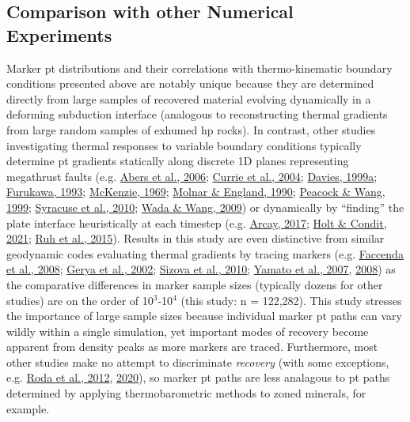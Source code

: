 \hypertarget{comparison-with-other-numerical-experiments}{%
\subsection{Comparison with other Numerical Experiments}\label{comparison-with-other-numerical-experiments}}

Marker \gls{pt} distributions and their correlations with thermo-kinematic boundary conditions presented above are notably unique because they are determined directly from large samples of recovered material evolving dynamically in a deforming subduction interface (analogous to reconstructing thermal gradients from large random samples of exhumed \gls{hp} rocks). In contrast, other studies investigating thermal responses to variable boundary conditions typically determine \gls{pt} gradients statically along discrete 1D planes representing megathrust faults (e.g. \protect\hyperlink{ref-abers2006}{Abers et al., 2006}; \protect\hyperlink{ref-currie2004}{Currie et al., 2004}; \protect\hyperlink{ref-davies1999b}{Davies, 1999a}; \protect\hyperlink{ref-furukawa1993}{Furukawa, 1993}; \protect\hyperlink{ref-mckenzie1969}{McKenzie, 1969}; \protect\hyperlink{ref-molnar1990}{Molnar \& England, 1990}; \protect\hyperlink{ref-peacock1999b}{Peacock \& Wang, 1999}; \protect\hyperlink{ref-syracuse2010}{Syracuse et al., 2010}; \protect\hyperlink{ref-wada2009}{Wada \& Wang, 2009}) or dynamically by ``finding'' the plate interface heuristically at each timestep (e.g. \protect\hyperlink{ref-arcay2017}{Arcay, 2017}; \protect\hyperlink{ref-holt2021}{Holt \& Condit, 2021}; \protect\hyperlink{ref-ruh2015}{Ruh et al., 2015}). Results in this study are even distinctive from similar geodynamic codes evaluating thermal gradients by tracing markers (e.g. \protect\hyperlink{ref-faccenda2008}{Faccenda et al., 2008}; \protect\hyperlink{ref-gerya2002}{Gerya et al., 2002}; \protect\hyperlink{ref-sizova2010}{Sizova et al., 2010}; \protect\hyperlink{ref-yamato2007}{Yamato et al., 2007}, \protect\hyperlink{ref-yamato2008}{2008}) as the comparative differences in marker sample sizes (typically dozens for other studies) are on the order of 10\(^3\)-10\(^4\) (this study: n = 122,282). This study stresses the importance of large sample sizes because individual marker \gls{pt} paths can vary wildly within a single simulation, yet important modes of recovery become apparent from density peaks as more markers are traced. Furthermore, most other studies make no attempt to discriminate \emph{recovery} (with some exceptions, e.g. \protect\hyperlink{ref-roda2012}{Roda et al., 2012}, \protect\hyperlink{ref-roda2020}{2020}), so marker \gls{pt} paths are less analagous to \gls{pt} paths determined by applying thermobarometric methods to zoned minerals, for example.


